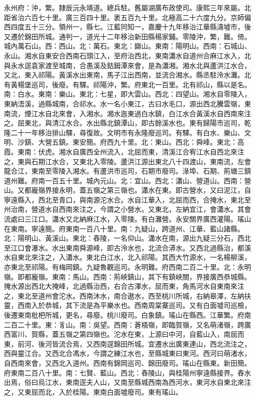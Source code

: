 \begin{pinyinscope}
永州府：沖，繁。隸辰沅永靖道。總兵駐。舊屬湖廣布政使司。康熙三年來屬。北距省治六百七十里。廣三百四十里。袤五百九十里。北極高二十六度九分。京師偏西四度五十三分。領州一，縣七。江藍同知一，嘉慶十九年移治江華縣濤墟市，後又遷於錦田所城。通判一，道光十二年移治新田縣楊家鋪。零陵沖，繁，難。倚。城內萬石山。西：西山。北：萬石。東北：巋山。東南：陽明山。西南：石城山、永山。湘水自東安合西南石頭江入，至府治西北，東南瀟水自道州合麻江水入，北與永水逕袁家渡至城南，合愚溪及鈷鉧潭來會，是為瀟湘。湘水北與蘆洪江水合，又北，東入祁陽。黃溪水出東南，馬子江出西南，並流合湘水。縣丞駐泠水灘。北有黃楊堡巡司，後廢。有驛。祁陽沖，繁。府東北一百里。北有祁山，縣以是名。南：白水。東南：樂山。東北：七星，即大雲山。西北：四望山。湘水自零陵入，東納浯溪，過縣城南，合祁水。水一名小東江，古曰水毛口，源出西北騰雲嶺，東南流，煙江水自北來會，入湘水。湘水迤東過白水鎮，白江水合黃溪水自西南來注之。屈東北，與清江水合。水出縣北鎮潭山，即古餘溪水也。東有歸陽市巡司，乾隆二十一年移治排山驛，尋復故。文明市有永隆廢巡司。有驛。有白水、樂山、文明、沙鎮、大營五鎮。東安簡。府西九十里。北：東山。西北：舜峰。東北：高霞。東南：伏虎。湘水自廣西全州流入，北屈而東，清溪江合宥江水自西北來注之，東與石期江水合，又東北入零陵。蘆洪江源出東北八十四渡山，東南流，左會龍合江，東南至零陵入湘水。有蘆洪市巡司，石期市廢司。淥埠、石期、荊塘三鎮道州難。府南一百五十里。城內元山。北：宜山。西北：瀟山、營道山。西南：營山。又都龐嶺界接永明，蓋五嶺之第三嶺也。瀟水在東。即古營水，又曰泥江，自寧遠縣入，西北至青口，與南源沱水合。水自江華入，北屈而西，合掩水，東北至州治南，營道水自西南來注之，今謂之小營水。又東北，左納宜江，會瀟水。其會流處曰三江口。瀟水又北納麻江水，入零陵。有白灘營。永安關界廣西灌陽。瑤山在東南。寧遠簡。府東南一百八十里。南：九疑山，跨道州、江華、藍山諸縣。北：陽明山、黃溪山。東北：舂陵，一名仰山。瀟水在南，源出九疑三分石，西北至江口會瀑水。水出東南舜源峰，即古泠水也，北流合漭水。又西北過縣治，都溪水自東北來注之，入瀟水。東北白江水，北入祁陽。其西大竹源水，一名楊柳溪，亦東北至祁陽。有梅岡鎮。九疑魯觀巡司。永明難。府西南二百二十里。北：永明嶺。即都龐嶺。東南：馬山。西南：荊峽鎮山，其下有鎮峽關，界接廣西恭城縣。掩水源出西北大掩峰，北過縣治西，右合古澤水，屈而東，角馬河水自東南來注之，東北至道州會沱水。西南沐水，南合遨水，西至桃川所城，右納皋澤，左納扶靈，西南入於恭城，其下流是為平樂水也。西南周棠寨巡司。又有白面墟司巡檢，後遷東南枇杷所城，更名，尋廢。桃川廢司。白象鎮。瑤山在縣西。江華繁。府南二百二十里。東：豸山。南：吳望。西南：蒼梧嶺，即臨賀嶺，又名萌渚嶺，跨廣西富川、賀縣，蓋五嶺之第四嶺也。沱水在東，上源曰中河，自藍山入，南屈而東，前河、後河皆流合焉，又西南逕錦田所城。宜遷水出廣東連山，西北流注之，西與靈江合。又西北合馮水，今謂之練江水也，至縣城東曰東河。西河曰萌渚水，自西南來會，又西北入道州。西南有錦岡巡司、錦田廢司。瑤山在縣東。新田簡。府東南二百八十里。南：七賢、藍山。西北：舂陵山，與桂陽州寧遠縣接界。舂水出焉，俗曰烏江水，東南逕夫人山，又南至縣城西南為西河水，東河水自東北來注之，又東屈而北，入於桂陽。東南白面墟廢司。東有瑤山。


\end{pinyinscope}
